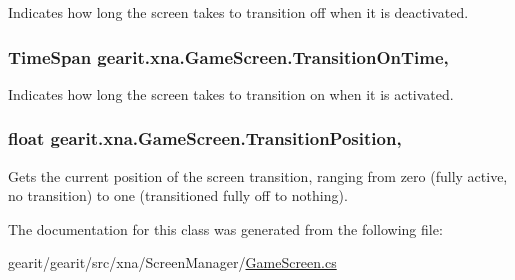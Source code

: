 Indicates how long the screen takes to transition off when it is deactivated. 

\hypertarget{classgearit_1_1xna_1_1_game_screen_afb57a139ac73624a198bf8c4e7222024}{
\subsubsection[{Transition\+On\+Time}]{\setlength{\rightskip}{0pt plus 5cm}Time\+Span gearit.\+xna.\+Game\+Screen.\+Transition\+On\+Time\hspace{0.3cm}{\ttfamily [get]}, {}}}\label{classgearit_1_1xna_1_1_game_screen_afb57a139ac73624a198bf8c4e7222024}


Indicates how long the screen takes to transition on when it is activated. 

\hypertarget{classgearit_1_1xna_1_1_game_screen_a768dba0b54380da831c21705866043a4}{
\subsubsection[{Transition\+Position}]{\setlength{\rightskip}{0pt plus 5cm}float gearit.\+xna.\+Game\+Screen.\+Transition\+Position\hspace{0.3cm}{\ttfamily [get]}, {}}}\label{classgearit_1_1xna_1_1_game_screen_a768dba0b54380da831c21705866043a4}


Gets the current position of the screen transition, ranging from zero (fully active, no transition) to one (transitioned fully off to nothing). 



The documentation for this class was generated from the following file\+:\begin{DoxyCompactItemize}
\item 
gearit/gearit/src/xna/\+Screen\+Manager/\hyperlink{_game_screen_8cs}{Game\+Screen.\+cs}\end{DoxyCompactItemize}
